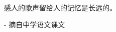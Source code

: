 \documentclass[main.tex]{subfiles}
\begin{document}
\begin{flushright}
	\begin{kaishu}
		感人的歌声留给人的记忆是长远的。\\
	\end{kaishu}
	- 摘自中学语文课文
\end{flushright}
\end{document}
